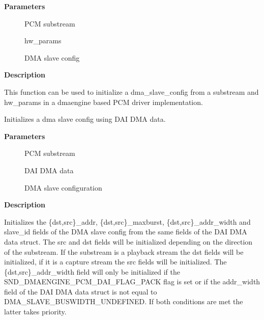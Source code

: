\documentclass[a4paper,8pt,english]{sphinxmanual}
\begin{document}
\textbf{Parameters}
\begin{description}
\item[{}] \leavevmode
PCM substream

\item[{}] \leavevmode
hw\_params

\item[{}] \leavevmode
DMA slave config

\end{description}

\textbf{Description}

This function can be used to initialize a dma\_slave\_config from a substream
and hw\_params in a dmaengine based PCM driver implementation.

\begin{fulllineitems}
\label{sound/kernel-api/alsa-driver-api:c.snd_dmaengine_pcm_set_config_from_dai_data}
Initializes a dma slave config using DAI DMA data.

\end{fulllineitems}


\textbf{Parameters}
\begin{description}
\item[{}] \leavevmode
PCM substream

\item[{}] \leavevmode
DAI DMA data

\item[{}] \leavevmode
DMA slave configuration

\end{description}

\textbf{Description}

Initializes the \{dst,src\}\_addr, \{dst,src\}\_maxburst, \{dst,src\}\_addr\_width and
slave\_id fields of the DMA slave config from the same fields of the DAI DMA
data struct. The src and dst fields will be initialized depending on the
direction of the substream. If the substream is a playback stream the dst
fields will be initialized, if it is a capture stream the src fields will be
initialized. The \{dst,src\}\_addr\_width field will only be initialized if the
SND\_DMAENGINE\_PCM\_DAI\_FLAG\_PACK flag is set or if the addr\_width field of
the DAI DMA data struct is not equal to DMA\_SLAVE\_BUSWIDTH\_UNDEFINED. If
both conditions are met the latter takes priority.
\end{document}
